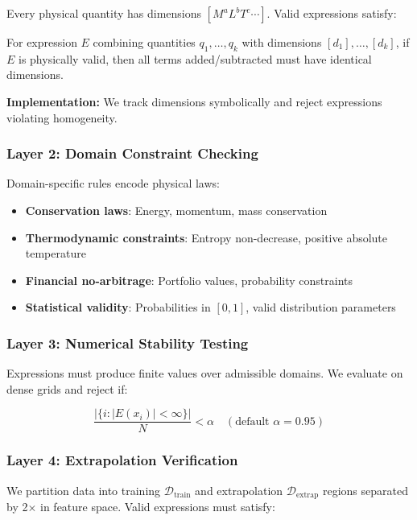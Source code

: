 \documentclass[twoside,11pt]{article}
\begin{document}
Every physical quantity has dimensions $[M^a L^b T^c \cdots]$. Valid expressions satisfy:

\begin{proposition}
\label{prop:dimensional}
For expression $E$ combining quantities $q_1, \ldots, q_k$ with dimensions $[d_1], \ldots, [d_k]$, if $E$ is physically valid, then all terms added/subtracted must have identical dimensions.
\end{proposition}

\textbf{Implementation:} We track dimensions symbolically and reject expressions violating homogeneity.

\subsubsection{Layer 2: Domain Constraint Checking}

Domain-specific rules encode physical laws:

\begin{itemize}
\item \textbf{Conservation laws}: Energy, momentum, mass conservation
\item \textbf{Thermodynamic constraints}: Entropy non-decrease, positive absolute temperature
\item \textbf{Financial no-arbitrage}: Portfolio values, probability constraints
\item \textbf{Statistical validity}: Probabilities in $[0,1]$, valid distribution parameters
\end{itemize}

\subsubsection{Layer 3: Numerical Stability Testing}

Expressions must produce finite values over admissible domains. We evaluate on dense grids and reject if:

\begin{equation}
\frac{|\{i : |E(x_i)| < \infty\}|}{N} < \alpha \quad (\text{default } \alpha = 0.95)
\end{equation}

\subsubsection{Layer 4: Extrapolation Verification}

We partition data into training $\mathcal{D}_{\text{train}}$ and extrapolation $\mathcal{D}_{\text{extrap}}$ regions separated by 2$\times$ in feature space. Valid expressions must satisfy:
\end{document}

